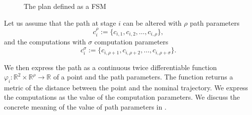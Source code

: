 \begin{figure}[h]
  \center
  \caption{The plan defined as a FSM}
  \label{fig:state-machine}
\end{figure}

Let us assume that the path at stage $i$ can be altered with $\rho$ path parameters
\begin{equation}
    c_i^\rho:=\{c_{i,1},c_{i,2},\dots,c_{i,\rho}\},
\end{equation}
and the computations with $\sigma$ computation parameters 
\begin{equation}
    c_i^\sigma:=\{c_{i,\rho+1},c_{i,\rho+2},\dots,c_{i,\rho+\sigma}\}.
\end{equation}

We then express the path as a continuous twice differentiable function $\varphi_i:\mathbb{R}^2\times\mathbb{R}^\rho\rightarrow\mathbb{R}$ of a point and the path parameters. The function returns a metric of the distance between the point and the nominal trajectory. We express the computations as the value of the computation parameters. We discuss the concrete meaning of the value of path parameters in .

